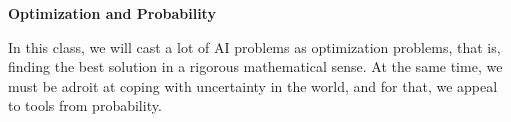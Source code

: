 \item {\bf Optimization and Probability}

In this class, we will cast a lot of AI problems as optimization problems, that is, finding the best solution in a rigorous mathematical sense. At the same time, we must be adroit at coping with uncertainty in the world, and for that, we appeal to tools from probability.

\begin{enumerate}

  

  

  

  

  

\end{enumerate}
